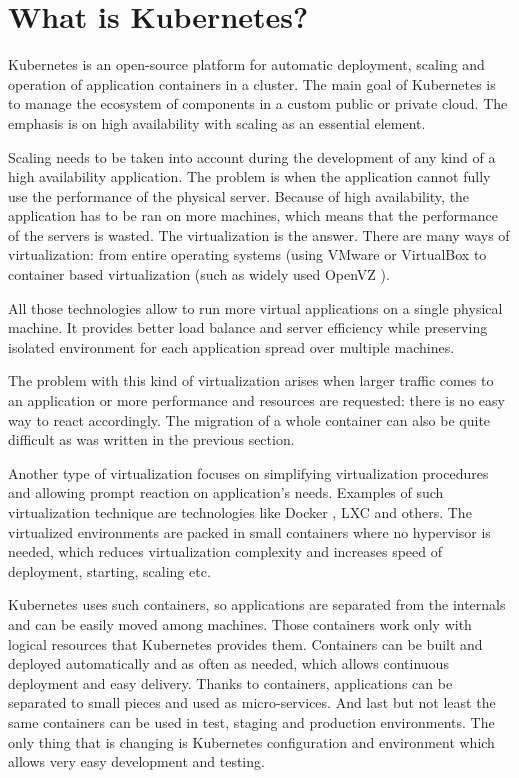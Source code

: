 \chapter{What is Kubernetes?}

Kubernetes is an open-source platform for automatic deployment, scaling and operation of application containers in a cluster. The main goal of Kubernetes is to manage the ecosystem of components in a custom public or private cloud. The emphasis is on high availability with scaling as an essential element.

Scaling needs to be taken into account during the development of any kind of a high availability application. The problem is when the application cannot fully use the performance of the physical server. Because of high availability, the application has to be ran on more machines, which means that the performance of the servers is wasted. The virtualization is the answer. There are many ways of virtualization: from entire operating systems (using VMware \cite{vmware} or VirtualBox \cite{virtualbox} to container based virtualization (such as widely used OpenVZ \cite{openvz}).

All those technologies allow to run more virtual applications on a single physical machine. It provides better load balance and server efficiency while preserving isolated environment for each application spread over multiple machines.  

The problem with this kind of virtualization arises when larger traffic comes to an application or more performance and resources are requested: there is no easy way to react accordingly. The migration of a whole container can also be quite difficult as was written in the previous section.

Another type of virtualization focuses on simplifying virtualization procedures and allowing prompt reaction on application’s needs. Examples of such virtualization technique are technologies like Docker \cite{docker}, LXC \cite{lxc}  and others. The virtualized environments are packed in small containers where no hypervisor is needed, which reduces virtualization complexity and increases speed of deployment, starting, scaling etc.   

Kubernetes uses such containers, so applications are separated from the internals and can be easily moved among machines. Those containers work only with logical resources that Kubernetes provides them. Containers can be built and deployed automatically and as often as needed, which allows continuous deployment and easy delivery. Thanks to containers, applications can be separated to small pieces and used as micro-services. And last but not least the same containers can be used in test, staging and production environments. The only thing that is changing is Kubernetes configuration and environment which allows very easy development and testing.

